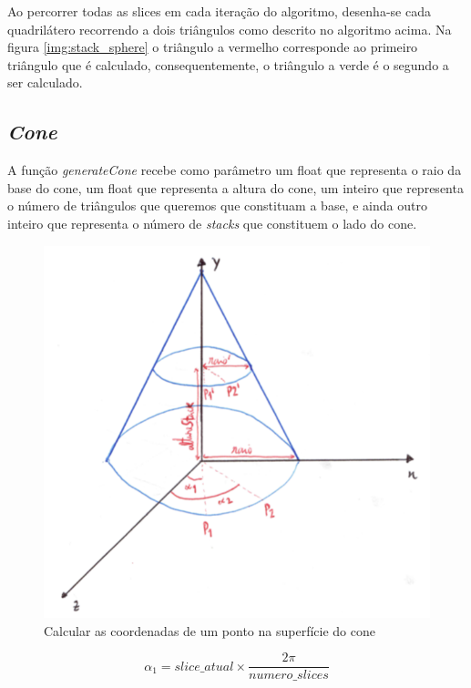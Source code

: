 \documentclass[a4paper]{article}
\begin{document}
Ao percorrer todas as slices em cada iteração do algoritmo, desenha-se cada quadrilátero recorrendo a dois triângulos como descrito no algoritmo acima. Na figura \ref{img:stack_sphere} o triângulo a vermelho corresponde ao primeiro triângulo que é calculado, consequentemente, o triângulo a verde é o segundo a ser calculado.

\newpage

\subsection{\textit{Cone}}
\label{sec:cone}
A função \textit{generateCone} recebe como parâmetro um float que representa o raio da base do cone, um float que representa a altura do cone, um inteiro que representa o número de triângulos que queremos que constituam a base, e ainda outro inteiro que representa o número de \textit{stacks} que constituem o lado do cone.


\begin{figure}[H]
\centering
\includegraphics[scale=0.50]{cone_pontos.png}
\caption{Calcular as coordenadas de um ponto na superfície do cone}
\label{img:cone_pontos}
\end{figure}

\ttfamily
$$\alpha_{1} = slice\_atual \times \frac{2\pi}{numero\_slices} $$

\vspace{0.5cm}
\end{document}
